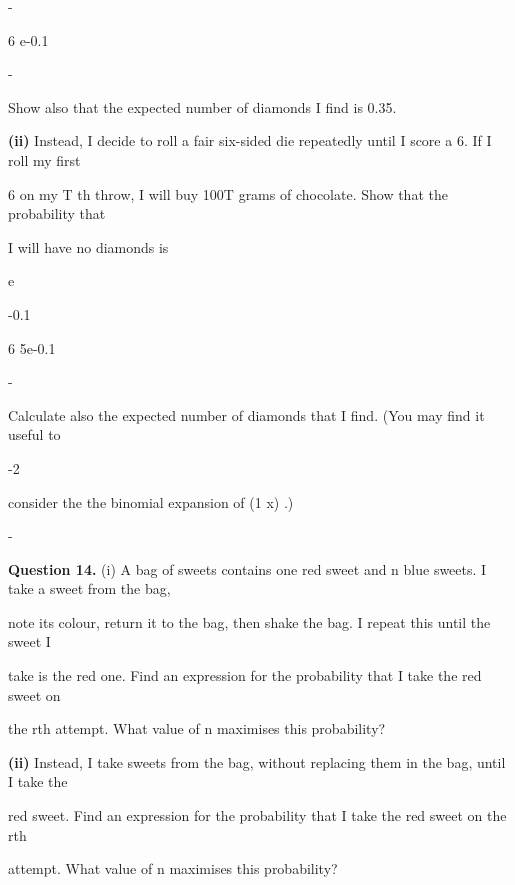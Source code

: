 \documentclass[12pt]{article}
\begin{document}
\begin{flushleft}
-\par
6  e-0.1 \mu\par
-\par
Show also that the expected number of diamonds I find is 0.35.\par
\textbf{(ii)} Instead, I decide to roll a fair six-sided die repeatedly until I score a 6. If I roll my first\par
6 on my T th throw, I will buy 100T grams of chocolate. Show that the probability that\par
I will have no diamonds is\par
e\par
-0.1\par
6 5e-0.1\par
-\par
Calculate also the expected number of diamonds that I find. (You may find it useful to\par
-2\par
consider the the binomial expansion of (1 x) .)\par
-\par
\bigskip\textbf{Question 14.} (i) A bag of sweets contains one red sweet and n blue sweets. I take a sweet from the bag,\par
note its colour, return it to the bag, then shake the bag. I repeat this until the sweet I\par
take is the red one. Find an expression for the probability that I take the red sweet on\par
the rth attempt. What value of n maximises this probability?\par
\textbf{(ii)} Instead, I take sweets from the bag, without replacing them in the bag, until I take the\par
red sweet. Find an expression for the probability that I take the red sweet on the rth\par
attempt. What value of n maximises this probability?\par
\end{flushleft}
\end{document}
